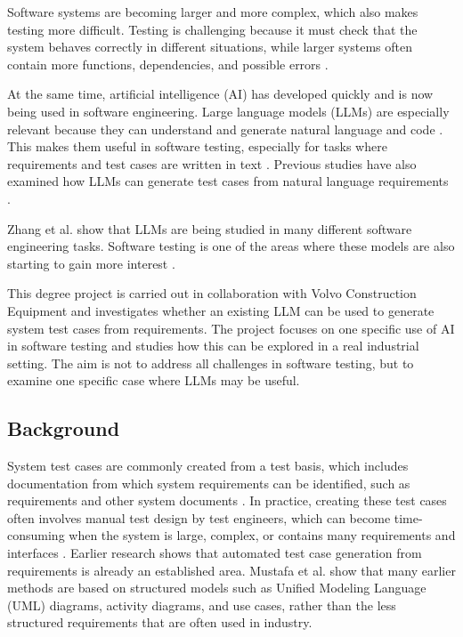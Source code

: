 \documentclass[a4paper,12pt]{article}
\begin{document}
Software systems are becoming larger and more complex, which also makes testing more difficult. Testing is challenging because it must check that the system behaves correctly in different situations, while larger systems often contain more functions, dependencies, and possible errors \cite{whittaker2002software, sommerville2016software}.

At the same time, artificial intelligence (AI) has developed quickly and is now being used in software engineering. Large language models (LLMs) are especially relevant because they can understand and generate natural language and code \cite{zhang2026survey}. This makes them useful in software testing, especially for tasks where requirements and test cases are written in text \cite{wang2024software}. Previous studies have also examined how LLMs can generate test cases from natural language requirements \cite{korraprolu2025test, bhatia2024system}. 

Zhang et al. \cite{zhang2026survey} show that LLMs are being studied in many different software engineering tasks. Software testing is one of the areas where these models are also starting to gain more interest \cite{wang2024software}.

This degree project is carried out in collaboration with Volvo Construction Equipment and investigates whether an existing LLM can be used to generate system test cases from requirements. The project focuses on one specific use of AI in software testing and studies how this can be explored in a real industrial setting. The aim is not to address all challenges in software testing, but to examine one specific case where LLMs may be useful.
\subsection{Background}
System test cases are commonly created from a test basis, which includes documentation from which system requirements can be identified, such as requirements and other system documents \cite{istqbTestBasis}. In practice, creating these test cases often involves manual test design by test engineers, which can become time-consuming when the system is large, complex, or contains many requirements and interfaces \cite{mustafa2021automated}. Earlier research shows that automated test case generation from requirements is already an established area. Mustafa et al. \cite{mustafa2021automated} show that many earlier methods are based on structured models such as Unified Modeling Language (UML) diagrams, activity diagrams, and use cases, rather than the less structured requirements that are often used in industry.
\end{document}
